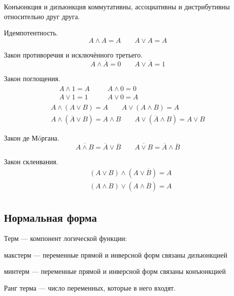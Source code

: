 Конъюнкция и дизъюнкция {\ital коммутативны}, {\ital ассоциативны} и {\ital дистрибутивны} относительно друг друга.
\begin{theorem}
{\bold Идемпотентность.}
$$A\land A=A\qquad A\lor A=A$$
\end{theorem}
\begin{theorem}
{\bold Закон противоречия} и {\bold исключённого третьего.}
$$A\land\overline{A}=0\qquad A\lor\overline{A}=1$$
\end{theorem}
\begin{theorem}
{\bold Закон поглощения.}
$$\begin{gathered}\begin{aligned}
&A\land 1=A &\quad &A\land 0=0\\
&A\lor 1=1 &\quad &A\lor 0=A
\end{aligned}\\
A\land (A\lor B)=A\qquad A\lor (A\land B)=A\\
A\land (\overline{A}\lor B)=A\land B\qquad A\lor (\overline{A}\land B)=A\lor B\end{gathered}$$
\end{theorem}
\begin{theorem}
{\bold Закон де Мóргана.}
$$\overline{A\land B}=\overline{A}\lor\overline{B}\qquad\overline{A\lor B}=\overline{A}\land\overline{B}$$
\end{theorem}
\begin{theorem}
{\bold Закон склеивания.}
$$\begin{aligned}
&(A\lor B)\land(A\lor \overline{B})=A\\
&(A\land B)\lor(A\land \overline{B})=A\\
\end{aligned}$$
\end{theorem}

\subsection{Нормальная форма}

{\bold Терм} --- компонент логической функции:

\begin{list*}
\item{\bold макстерм} --- переменные прямой и инверсной форм связаны {\ital дизъюнкцией}
\item{\bold минтерм} --- переменные прямой и инверсной форм связаны {\ital конъюнкцией}
\end{list*}
{\bold Ранг} {\ital терма} --- число переменных, которые в него входят.

